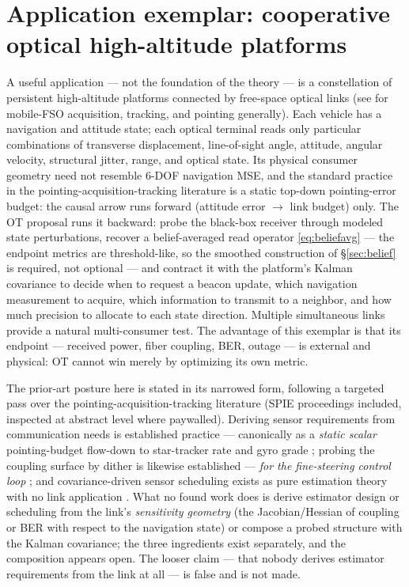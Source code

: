\documentclass{article}
\theoremstyle{definition}
\theoremstyle{remark}
\begin{document}
\section{Application exemplar: cooperative optical high-altitude platforms}
\label{sec:fso}

A useful application --- not the foundation of the theory --- is a
constellation of persistent high-altitude platforms connected by free-space
optical links (see \citep{kaymak2018} for mobile-FSO acquisition, tracking,
and pointing generally). Each vehicle has a navigation and attitude
state; each optical terminal reads only particular combinations of
transverse displacement, line-of-sight angle, attitude, angular velocity,
structural jitter, range, and optical state. Its physical consumer geometry
need not resemble 6-DOF navigation MSE, and the standard practice in the
pointing-acquisition-tracking literature is a static top-down pointing-error
budget: the causal arrow runs forward (attitude error $\to$ link budget)
only. The OT proposal runs it backward: probe the black-box receiver through
modeled state perturbations, recover a belief-averaged read operator
\eqref{eq:beliefavg} --- the endpoint metrics are threshold-like, so the
smoothed construction of \S\ref{sec:belief} is required, not optional ---
and contract it with the platform's Kalman covariance to decide when to
request a beacon update, which navigation measurement to acquire, which
information to transmit to a neighbor, and how much precision to allocate to
each state direction. Multiple simultaneous links provide a natural
multi-consumer test. The advantage of this exemplar is that its endpoint ---
received power, fiber coupling, BER, outage --- is external and physical: OT
cannot win merely by optimizing its own metric.

The prior-art posture here is stated in its narrowed form, following a
targeted pass over the pointing-acquisition-tracking literature (SPIE
proceedings included, inspected at abstract level where paywalled).
Deriving sensor requirements from communication needs is established
practice --- canonically as a \emph{static scalar} pointing-budget
flow-down to star-tracker rate and gyro grade \citep{leeortiz2005}; probing
the coupling surface by dither is likewise established --- \emph{for the
fine-steering control loop} \citep{spgd2020}; and covariance-driven sensor
scheduling exists as pure estimation theory with no link application
\citep{alahdab2025}. What no found work does is derive estimator design or
scheduling from the link's \emph{sensitivity geometry} (the
Jacobian/Hessian of coupling or BER with respect to the navigation state)
or compose a probed structure with the Kalman covariance; the three
ingredients exist separately, and the composition appears open. The looser
claim --- that nobody derives estimator requirements from the link at all
--- is false and is not made.
\end{document}
